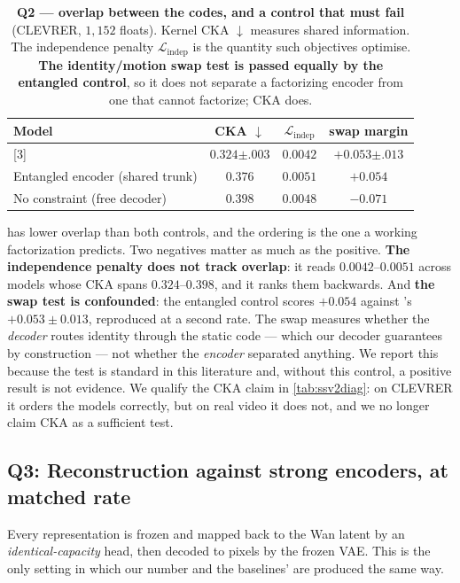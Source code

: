 \begin{table}[t]
\centering\small
\caption{\textbf{Q2 --- overlap between the codes, and a control that must fail}
(CLEVRER, $1{,}152$ floats). Kernel CKA $\downarrow$ measures shared information. The
independence penalty $\mathcal{L}_{\mathrm{indep}}$ is the quantity such objectives
optimise. \textbf{The identity/motion swap test is passed equally by the entangled
control}, so it does not separate a factorizing encoder from one that cannot factorize;
CKA does.}
\label{tab:overlap}
\begin{tabular}{lccc}
\toprule
Model & CKA $\downarrow$ & $\mathcal{L}_{\mathrm{indep}}$ & swap margin \\
\midrule
\textbf{\method{}} [3] & $\mathbf{0.324}${\tiny$\pm.003$} & $0.0042$ & $+0.053${\tiny$\pm.013$} \\
Entangled encoder (shared trunk) & $0.376$ & $0.0051$ & $+0.054$ \\
No constraint (free decoder) & $0.398$ & $0.0048$ & $-0.071$ \\
\bottomrule
\end{tabular}
\end{table}

\method{} has lower overlap than both controls, and the ordering is the one a working
factorization predicts. Two negatives matter as much as the positive.
\textbf{The independence penalty does not track overlap}: it reads $0.0042$--$0.0051$
across models whose CKA spans $0.324$--$0.398$, and it ranks them backwards. And
\textbf{the swap test is confounded}: the entangled control scores $+0.054$ against
\method{}'s $+0.053\pm0.013$, reproduced at a second rate. The swap measures whether the
\emph{decoder} routes identity through the static code --- which our decoder guarantees
by construction --- not whether the \emph{encoder} separated anything. We report this
because the test is standard in this literature \citep{s3vae,cdsvae,divid} and, without
this control, a positive result is not evidence. We qualify the CKA claim in
\cref{tab:ssv2diag}: on CLEVRER it orders the models correctly, but on real video it does
not, and we no longer claim CKA as a sufficient test.

\subsection{Q3: Reconstruction against strong encoders, at matched rate}
\label{sec:q3}
Every representation is frozen and mapped back to the Wan latent by an
\emph{identical-capacity} head, then decoded to pixels by the frozen VAE. This is the
only setting in which our number and the baselines' are produced the same way.


